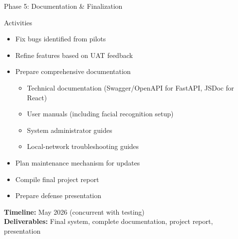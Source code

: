 \begin{frame}{Phase 5: Documentation \& Finalization}
    \begin{block}{Activities}
        \begin{itemize}
            \item Fix bugs identified from pilots
            \item Refine features based on UAT feedback
            \item Prepare comprehensive documentation
            \begin{itemize}
                \item Technical documentation (Swagger/OpenAPI for FastAPI, JSDoc for React)
                \item User manuals (including facial recognition setup)
                \item System administrator guides
                \item Local-network troubleshooting guides
            \end{itemize}
            \item Plan maintenance mechanism for updates
            \item Compile final project report
            \item Prepare defense presentation
        \end{itemize}
    \end{block}
    
    \textbf{Timeline:} May 2026 (concurrent with testing) \\
    \textbf{Deliverables:} Final system, complete documentation, project report, presentation
\end{frame}

